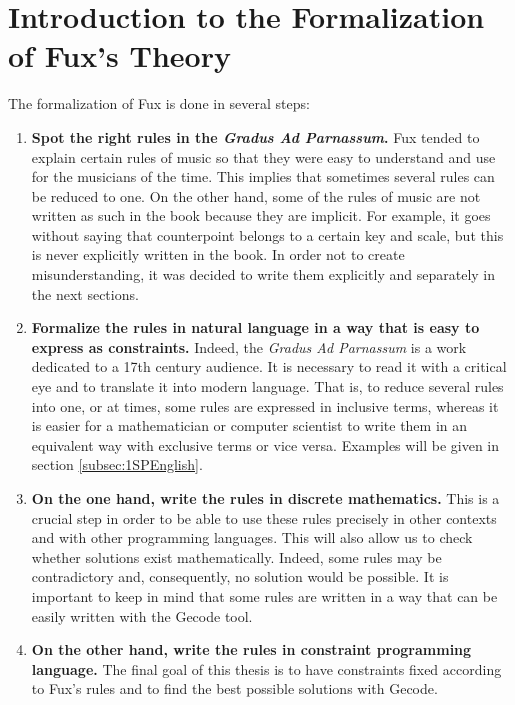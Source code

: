 \chapter{Introduction to the Formalization of Fux's Theory}\label{ch:Formalization}
The formalization of Fux is done in several steps:
\begin{enumerate}[wide]
    \item \textbf{Spot the right rules in the \textit{Gradus Ad Parnassum}.} Fux tended to explain certain rules of music so that they were easy to understand and use for the musicians of the time. This implies that sometimes several rules can be reduced to one. On the other hand, some of the rules of music are not written as such in the book because they are implicit. For example, it goes without saying that counterpoint belongs to a certain key and scale, but this is never explicitly written in the book. In order not to create misunderstanding, it was decided to write them explicitly and separately in the next sections.
    \item \textbf{Formalize the rules in natural language in a way that is easy to express as constraints.} Indeed, the \textit{Gradus Ad Parnassum} is a work dedicated to a 17th century audience. It is necessary to read it with a critical eye and to translate it into modern language. That is, to reduce several rules into one, or at times, some rules are expressed in inclusive terms, whereas it is easier for a mathematician or computer scientist to write them in an equivalent way with exclusive terms or vice versa. Examples will be given in section \ref{subsec:1SPEnglish}.
    \item \textbf{On the one hand, write the rules in discrete mathematics.} This is a crucial step in order to be able to use these rules precisely in other contexts and with other programming languages. This will also allow us to check whether solutions exist mathematically. Indeed, some rules may be contradictory and, consequently, no solution would be possible. It is important to keep in mind that some rules are written in a way that can be easily written with the Gecode tool.
    \item \textbf{On the other hand, write the rules in constraint programming language.} The final goal of this thesis is to have constraints fixed according to Fux's rules and to find the best possible solutions with Gecode.
\end{enumerate}




